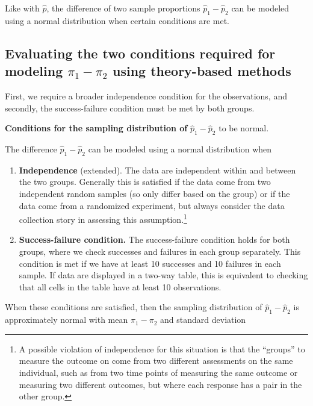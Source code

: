 \documentclass[
  10pt,
  openany]{book}
\providecommand{\tightlist}{%
  \setlength{\itemsep}{0pt}\setlength{\parskip}{0pt}}
\theoremstyle{definition}
\theoremstyle{definition}
\theoremstyle{definition}
\theoremstyle{definition}
\theoremstyle{remark}
\begin{document}
Like with \(\hat{p}\), the difference of two sample proportions \(\hat{p}_1 - \hat{p}_2\) can be modeled using a normal distribution when certain conditions are met.

\subsection{\texorpdfstring{Evaluating the two conditions required for modeling \(\pi_1 - \pi_2\) using theory-based methods}{Evaluating the two conditions required for modeling \textbackslash pi\_1 - \textbackslash pi\_2 using theory-based methods}}\label{evaluating-the-two-conditions-required-for-modeling-pi_1---pi_2-using-theory-based-methods}

First, we require a broader independence condition for the observations, and secondly, the success-failure condition must be met by both groups.

\textbf{Conditions for the sampling distribution of} \(\hat{p}_1 -\hat{p}_2\) to be normal.

The difference \(\hat{p}_1 - \hat{p}_2\) can be modeled using a normal distribution when

\begin{enumerate}
\def\labelenumi{\arabic{enumi}.}
\tightlist
\item
  \textbf{Independence} (extended). The data are independent within and between the two groups. Generally this is satisfied if the data come from two independent random samples (so only differ based on the group) or if the data come from a randomized experiment, but always consider the data collection story in assessing this assumption.\footnote{A possible violation of independence for this situation is that the ``groups'' to measure the outcome on come from two different assessments on the same individual, such as from two time points of measuring the same outcome or measuring two different outcomes, but where each response has a pair in the other group.}
\item
  \textbf{Success-failure condition.} The success-failure condition holds for both groups, where we check successes and failures in each group separately. This condition is met if we have at least 10 successes and 10 failures in each sample. If data are displayed in a two-way table, this is equivalent to checking that all cells in the table have at least 10 observations.
\end{enumerate}

When these conditions are satisfied, then the sampling distribution of \(\hat{p}_1 - \hat{p}_2\) is approximately normal with mean \(\pi_1 - \pi_2\) and standard deviation
\end{document}
